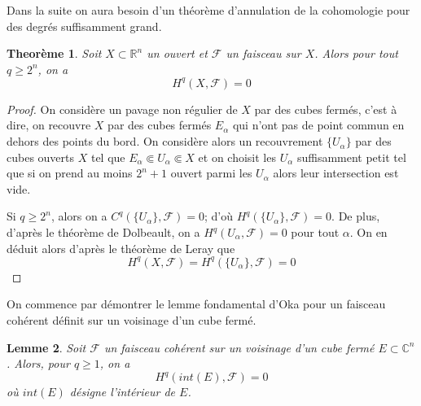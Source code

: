 \documentclass{article}
\newtheorem{theoreme}{Theorème}[section]
\newtheorem{lemme}[theoreme]{Lemme}
\theoremstyle{definition}
\theoremstyle{remarque}
\begin{document}
Dans la suite on aura besoin d'un théorème d'annulation de la cohomologie pour des degrés suffisamment grand.
\begin{theoreme}
Soit $X \subset \mathbb{R}^n$ un ouvert et $\mathcal{F}$ un faisceau sur $X$. Alors pour tout $q \geq 2^n$, on a $$H^q(X, \mathcal{F})=0$$
\end{theoreme}

\begin{proof}
On considère un pavage non régulier de $X$ par des cubes fermés, c'est à dire, on recouvre $X$ par des cubes fermés $E_\alpha$ qui n'ont pas de point commun en dehors des points du bord. On considère alors un recouvrement $\{U_\alpha\}$ par des cubes ouverts $X$ tel que $E_\alpha \Subset U_\alpha \Subset X$ et on choisit les $U_\alpha$ suffisamment petit tel que si on prend au moins $2^n+1$ ouvert parmi les $U_\alpha$ alors leur intersection est vide.

Si $q \geq 2^n$, alors on a $C^q(\{U_\alpha\}, \mathcal{F})=0$; d'où $H^q(\{U_\alpha\}, \mathcal{F})=0$. De plus, d'après le théorème de Dolbeault, on a $H^q(U_\alpha, \mathcal{F})=0$ pour tout $\alpha$. On en déduit alors d'après le théorème de Leray que
$$H^q(X, \mathcal{F})=H^q(\{U_\alpha\}, \mathcal{F})=0$$
\end{proof}

On commence par démontrer le lemme fondamental d'Oka pour un faisceau cohérent définit sur un voisinage d'un cube fermé.
\begin{lemme}
Soit $\mathcal{F}$ un faisceau cohérent sur un voisinage d'un cube fermé $E \subset \mathbb{C}^n$. Alors, pour $q \geq 1$, on a
$$H^q(int(E), \mathcal{F})=0$$
où $int(E)$ désigne l'intérieur de $E$.
\end{lemme}
\end{document}
